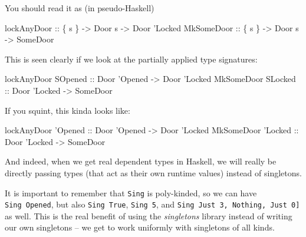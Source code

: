 \documentclass[]{article}
\newenvironment{Shaded}{}{}
\newcommand{\DataTypeTok}[1]{\textcolor[rgb]{0.56,0.13,0.00}{#1}}
\newcommand{\NormalTok}[1]{#1}
\newcommand{\OtherTok}[1]{\textcolor[rgb]{0.00,0.44,0.13}{#1}}
\begin{document}
You should read it as (in pseudo-Haskell)

\begin{Shaded}
\begin{Highlighting}[]
\OtherTok{lockAnyDoor ::}\NormalTok{ \{ s \} }\OtherTok{->} \DataTypeTok{Door}\NormalTok{ s }\OtherTok{->} \DataTypeTok{Door} \DataTypeTok{'Locked}
\DataTypeTok{MkSomeDoor}\OtherTok{  ::}\NormalTok{ \{ s \} }\OtherTok{->} \DataTypeTok{Door}\NormalTok{ s }\OtherTok{->} \DataTypeTok{SomeDoor}
\end{Highlighting}
\end{Shaded}

This is seen clearly if we look at the partially applied type signatures:

\begin{Shaded}
\begin{Highlighting}[]
\NormalTok{lockAnyDoor }\DataTypeTok{SOpened}\OtherTok{ ::} \DataTypeTok{Door} \DataTypeTok{'Opened} \OtherTok{->} \DataTypeTok{Door} \DataTypeTok{'Locked}
\DataTypeTok{MkSomeDoor}  \DataTypeTok{SLocked}\OtherTok{ ::} \DataTypeTok{Door} \DataTypeTok{'Locked} \OtherTok{->} \DataTypeTok{SomeDoor}
\end{Highlighting}
\end{Shaded}

If you squint, this kinda looks like:

\begin{Shaded}
\begin{Highlighting}[]
\NormalTok{lockAnyDoor }\DataTypeTok{'Opened}\OtherTok{ ::} \DataTypeTok{Door} \DataTypeTok{'Opened} \OtherTok{->} \DataTypeTok{Door} \DataTypeTok{'Locked}
\DataTypeTok{MkSomeDoor}  \DataTypeTok{'Locked}\OtherTok{ ::} \DataTypeTok{Door} \DataTypeTok{'Locked} \OtherTok{->} \DataTypeTok{SomeDoor}
\end{Highlighting}
\end{Shaded}

And indeed, when we get real dependent types in Haskell, we will really be
directly passing types (that act as their own runtime values) instead of
singletons.

It is important to remember that \texttt{Sing} is poly-kinded, so we can have
\texttt{Sing\ \textquotesingle{}Opened}, but also
\texttt{Sing\ \textquotesingle{}True}, \texttt{Sing\ 5}, and
\texttt{Sing\ \textquotesingle{}{[}\textquotesingle{}Just\ 3,\ \textquotesingle{}Nothing,\ \textquotesingle{}Just\ 0{]}}
as well. This is the real benefit of using the \emph{singletons} library instead
of writing our own singletons -- we get to work uniformly with singletons of all
kinds.
\end{document}
